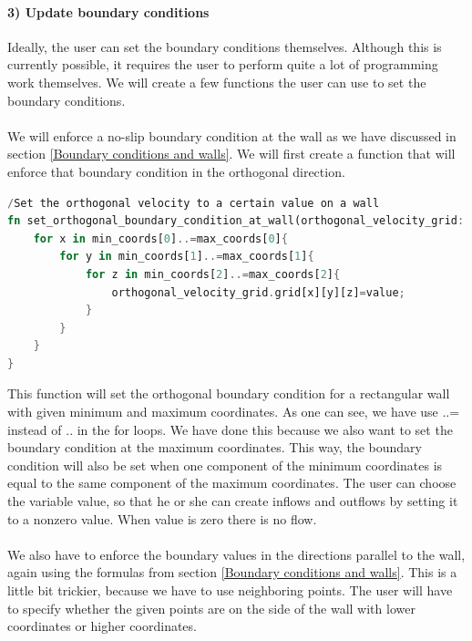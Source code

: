 \documentclass{article}
\begin{document}
\paragraph{3) Update boundary conditions}
Ideally, the user can set the boundary conditions themselves. Although this is currently possible, it requires the user to perform quite a lot of programming work themselves. We will create a few functions the user can use to set the boundary conditions. 
\\ \\
We will enforce a no-slip boundary condition at the wall as we have discussed in section \ref{Boundary conditions and walls}. We will first create a function that will enforce that boundary condition in the orthogonal direction. 
\begin{lstlisting}[language=Rust, style=boxed, breaklines=true]
/Set the orthogonal velocity to a certain value on a wall
fn set_orthogonal_boundary_condition_at_wall(orthogonal_velocity_grid: &mut VelocityGrid, min_coords: [usize; 3], max_coords: [usize; 3], value: f32){
    for x in min_coords[0]..=max_coords[0]{
        for y in min_coords[1]..=max_coords[1]{
            for z in min_coords[2]..=max_coords[2]{
                orthogonal_velocity_grid.grid[x][y][z]=value;
            }
        }
    }
}
\end{lstlisting}
This function will set the orthogonal boundary condition for a rectangular wall with given minimum and maximum coordinates. As one can see, we have use ..= instead of .. in the for loops. We have done this because we also want to set the boundary condition at the maximum coordinates. This way, the boundary condition will also be set when one component of the minimum coordinates is equal to the same  component of the maximum coordinates. The user can choose the variable value, so that he or she can create inflows and outflows by setting it to a nonzero value. When value is zero there is no flow.
\\ \\
We also have to enforce the boundary values in the directions parallel to the wall, again using the formulas from section \ref{Boundary conditions and walls}. This is a little bit trickier, because we have to use neighboring points. The user will have to specify whether the given points are on the side of the wall with lower coordinates or higher coordinates.
\end{document}
